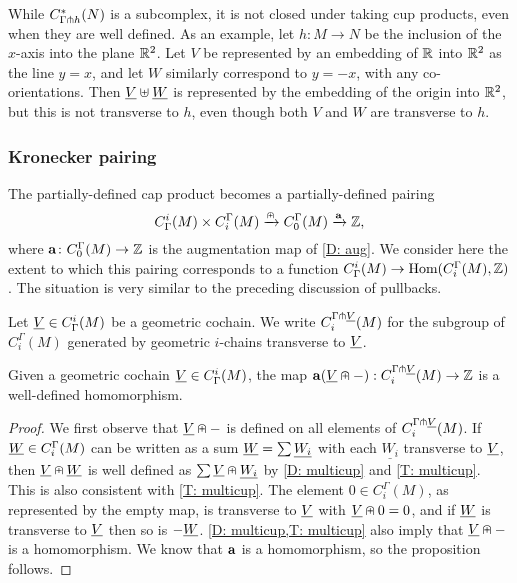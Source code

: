 \begin{remark}
	While $C^*_{\Gamma \pitchfork h}(N)$ is a subcomplex, it is not closed under taking cup products, even when they are well defined.
	As an example, let $h \colon M \to N$ be the inclusion of the $x$-axis into the plane $\mathbb{R}^2$.
	Let $V$ be represented by an embedding of $\mathbb{R}$ into $\mathbb{R}^2$ as the line $y = x$, and let $W$ similarly correspond to $y = -x$, with any co-orientations.
	Then $\underline{V} \uplus \underline{W}$ is represented by the embedding of the origin into $\mathbb{R}^2$, but this is not transverse to $h$, even though both $V$ and $W$ are transverse to $h$.
\end{remark}

\subsubsection{Kronecker pairing}\label{S: Kronecker}

The partially-defined cap product becomes a partially-defined pairing
$$C^i_\Gamma(M) \times C_i^\Gamma(M) \xrightarrow{\nplus} C_0^\Gamma(M) \xrightarrow{\mathbf{a}}\mathbb{Z},$$
where $\mathbf{a} \colon C_0^\Gamma(M) \to \mathbb{Z}$ is the augmentation map of \cref{D: aug}.
We consider here the extent to which this pairing corresponds to a function $C^i_\Gamma(M) \to \textup{Hom}(C_i^\Gamma(M),\mathbb{Z})$.
The situation is very similar to the preceding discussion of pullbacks.

\begin{definition}\label{D: transverse to cohain}
	Let $\underline{V} \in C^i_\Gamma(M)$ be a geometric cochain.
	We write $C_i^{\Gamma \pitchfork \underline{V}}(M)$ for the subgroup of $C_i^\Gamma(M)$ generated by geometric $i$-chains transverse to $\underline{V}$.
\end{definition}

\begin{proposition}
	Given a geometric cochain $\underline{V} \in C^i_\Gamma(M)$, the map $\mathbf{a}(\underline{V}\nplus -):C_i^{\Gamma \pitchfork \underline{V}}(M) \to \mathbb{Z}$ is a well-defined homomorphism.
\end{proposition}

\begin{proof}
	We first observe that $\underline{V}\nplus -$ is defined on all elements of $C_i^{\Gamma \pitchfork \underline{V}}(M)$.
	If $\underline{W} \in C_i^\Gamma(M)$ can be written as a sum $\underline{W} = \sum \underline{W_i}$ with each $\underline{W_i}$ transverse to $\underline{V}$, then $\underline{V}\nplus \underline{W}$ is well defined as $\sum \underline{V}\nplus \underline{W_i}$ by \cref{D: multicup} and \cref{T: multicup}.
	This is also consistent with \cref{T: multicup}.
	The element $0 \in C_i^\Gamma(M)$, as represented by the empty map, is transverse to $\underline{V}$ with $\underline{V}\nplus 0 = 0$, and if $\underline{W}$ is transverse to $\underline{V}$ then so is $-\underline{W}$.
	\cref{D: multicup,T: multicup} also imply that $\underline{V} \nplus -$ is a homomorphism.
	We know that $\mathbf{a}$ is a homomorphism, so the proposition follows.
\end{proof}

